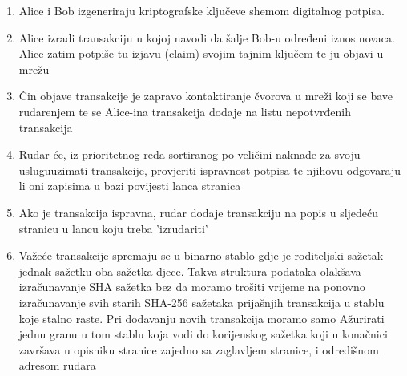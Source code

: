 \documentclass[utf8, zavrsni]{fer}
\begin{document}
\begin{enumerate}
	\item Alice i Bob izgeneriraju kriptografske ključeve shemom digitalnog potpisa.
	\item Alice izradi transakciju u kojoj navodi da šalje Bob-u određeni iznos novaca. Alice zatim potpiše tu izjavu (claim) svojim tajnim ključem te ju objavi u mrežu
	
	\item Čin objave transakcije je zapravo kontaktiranje čvorova u mreži koji se bave rudarenjem te se Alice-ina transakcija dodaje na listu nepotvrđenih transakcija\footnotemark
	
	\item Rudar će, iz prioritetnog reda sortiranog po veličini naknade za svoju uslugu\footnotemark uzimati transakcije, provjeriti ispravnost potpisa te njihovu odgovaraju li oni zapisima u bazi povijesti lanca stranica
	
	\item Ako je transakcija ispravna, rudar dodaje transakciju na popis u sljedeću stranicu u lancu koju treba 'izrudariti'
	\item Važeće transakcije spremaju se u binarno stablo gdje je roditeljski sažetak jednak sažetku oba sažetka djece\footnotemark. Takva struktura podataka olakšava izračunavanje SHA sažetka bez da moramo trošiti vrijeme na ponovno izračunavanje svih starih SHA-256 sažetaka prijašnjih transakcija u stablu koje stalno raste. Pri dodavanju novih transakcija moramo samo Ažurirati jednu granu u tom stablu koja vodi do korijenskog sažetka koji u konačnici završava u opisniku stranice zajedno sa zaglavljem stranice, i odredišnom adresom rudara
	

\end{enumerate}
\end{document}
